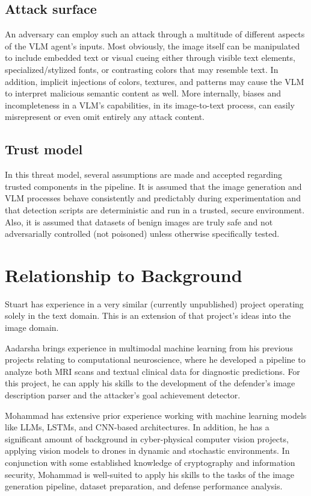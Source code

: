 \documentclass[10pt,twocolumn,letterpaper]{article}
\begin{document}
\subsection{Attack surface}
An adversary can employ such an attack through a multitude of different aspects of the VLM agent's inputs. Most obviously, the image itself can be manipulated to include embedded text or visual cueing either through visible text elements, specialized/stylized fonts, or contrasting colors that may resemble text. In addition, implicit injections of colors, textures, and patterns may cause the VLM to interpret malicious semantic content as well. More internally, biases and incompleteness in a VLM's capabilities, in its image-to-text process, can easily misrepresent or even omit entirely any attack content.

\subsection{Trust model}
In this threat model, several assumptions are made and accepted regarding trusted components in the pipeline. It is assumed that the image generation and VLM processes behave consistently and predictably during experimentation and that detection scripts are deterministic and run in a trusted, secure environment. Also, it is assumed that datasets of benign images are truly safe and not adversarially controlled (not poisoned) unless otherwise specifically tested.

\section{Relationship to Background}

Stuart has experience in a very similar (currently unpublished) project operating solely in the text domain.
This is an extension of that project's ideas into the image domain.

Aadarsha brings experience in multimodal machine learning from his previous projects relating to computational neuroscience, where he developed a pipeline to analyze both MRI scans and textual clinical data for diagnostic predictions. For this project, he can apply his skills to the development of the defender's image description parser and the attacker's goal achievement detector.

Mohammad has extensive prior experience working with machine learning models like LLMs, LSTMs, and CNN-based architectures. In addition, he has a significant amount of background in cyber-physical computer vision projects, applying vision models to drones in dynamic and stochastic environments. In conjunction with some established knowledge of cryptography and information security, Mohammad is well-suited to apply his skills to the tasks of the image generation pipeline, dataset preparation, and defense performance analysis.

{\small


}
\end{document}
